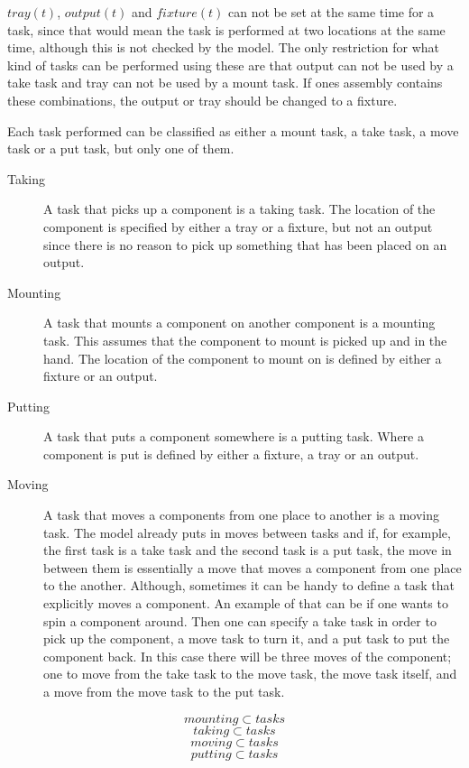   \noindent $tray(t)$, $output(t)$ and $fixture(t)$ can not be set at the same time for a task, since that would mean the task is performed at two locations at the same time, although this is not checked by the model. The only restriction for what kind of tasks can be performed using these are that output can not be used by a take task and tray can not be used by a mount task. If ones assembly contains these combinations, the output or tray should be changed to a fixture.
 
  Each task performed can be classified as either a mount task, a take task, a move task or a put task, but only one of them.
  \begin{description}
  \item[Taking] A task that picks up a component is a taking task. The location of the component is specified by either a tray or a fixture, but not an output since there is no reason to pick up something that has been placed on an output.
  
  \item[Mounting] A task that mounts a component on another component is a mounting task. This assumes that the component to mount is picked up and in the hand. The location of the component to mount on is defined by either a fixture or an output.
  
  \item[Putting] A task that puts a component somewhere is a putting task. Where a component is put is defined by either a fixture, a tray or an output.
  
  \item[Moving] A task that moves a components from one place to another is a moving task. The model already puts in moves between tasks and if, for example, the first task is a take task and the second task is a put task, the move in between them is essentially a move that moves a component from one place to the another. Although, sometimes it can be handy to define a task that explicitly moves a component. An example of that can be if one wants to spin a component around. Then one can specify a take task in order to pick up the component, a move task to turn it, and a put task to put the component back. In this case there will be three moves of the component; one to move from the take task to the move task, the move task itself, and a move from the move task to the put task.
   \end{description}
 \begin{equation}\label{eq:26}
 mounting \subset tasks
 \end{equation}
 \begin{equation}\label{eq:27}
 taking \subset tasks
 \end{equation}
 \begin{equation}\label{eq:28}
 moving \subset tasks
 \end{equation}
 \begin{equation}\label{eq:29}
 putting \subset tasks
 \end{equation}

